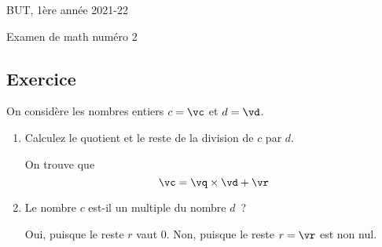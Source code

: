 \documentclass[a4paper,12pt]{article}
\begin{document}
\noindent BUT, 1ère année \hfill 2021-22

\begin{center} \Large Examen de math numéro 2 \end{center}





\subsection*{Exercice}

On considère les nombres entiers $c=\vc$ et $d=\vd$.

\begin{enumerate}
\item Calculez le quotient et le reste de la division de $c$ par $d$.

\begin{correction}
On trouve que
\[
\vc = \vq\times\vd + \vr
\]
\end{correction}

\item Le nombre $c$ est-il un multiple du nombre $d$~?

\begin{correction}
{Oui, puisque le reste $r$ vaut 0.}
{Non, puisque le reste $r=\vr$ est non nul.}
\end{correction}


\end{enumerate}
\end{document}
